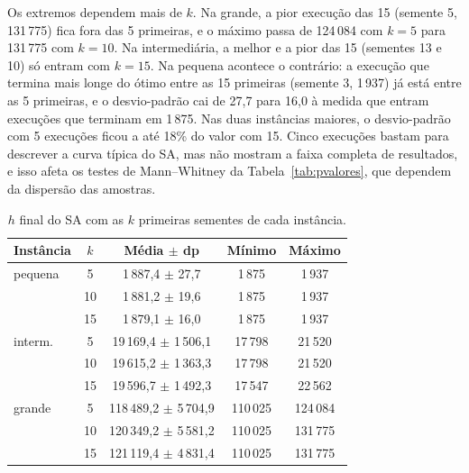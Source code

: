 Os extremos dependem mais de $k$. Na grande, a pior execução das 15 (semente 5, 131\,775) fica fora das 5 primeiras, e o máximo passa de 124\,084 com $k=5$ para 131\,775 com $k=10$. Na intermediária, a melhor e a pior das 15 (sementes 13 e 10) só entram com $k=15$. Na pequena acontece o contrário: a execução que termina mais longe do ótimo entre as 15 primeiras (semente 3, 1\,937) já está entre as 5 primeiras, e o desvio-padrão cai de 27{,}7 para 16{,}0 à medida que entram execuções que terminam em 1\,875. Nas duas instâncias maiores, o desvio-padrão com 5 execuções ficou a até 18\% do valor com 15. Cinco execuções bastam para descrever a curva típica do SA, mas não mostram a faixa completa de resultados, e isso afeta os testes de Mann--Whitney da Tabela~\ref{tab:pvalores}, que dependem da dispersão das amostras.

\begin{table}[H]
\centering
\caption{$h$ final do SA com as $k$ primeiras sementes de cada instância.}
\label{tab:runs-sa}
\small
\setlength{\tabcolsep}{4pt}
\begin{tabular}{lcccc}
\toprule
Instância & $k$ & Média $\pm$ dp & Mínimo & Máximo\\
\midrule
pequena & 5  & 1\,887{,}4 $\pm$ 27{,}7 & 1\,875 & 1\,937\\
        & 10 & 1\,881{,}2 $\pm$ 19{,}6 & 1\,875 & 1\,937\\
        & 15 & 1\,879{,}1 $\pm$ 16{,}0 & 1\,875 & 1\,937\\
\midrule
interm. & 5  & 19\,169{,}4 $\pm$ 1\,506{,}1 & 17\,798 & 21\,520\\
        & 10 & 19\,615{,}2 $\pm$ 1\,363{,}3 & 17\,798 & 21\,520\\
        & 15 & 19\,596{,}7 $\pm$ 1\,492{,}3 & 17\,547 & 22\,562\\
\midrule
grande  & 5  & 118\,489{,}2 $\pm$ 5\,704{,}9 & 110\,025 & 124\,084\\
        & 10 & 120\,349{,}2 $\pm$ 5\,581{,}2 & 110\,025 & 131\,775\\
        & 15 & 121\,119{,}4 $\pm$ 4\,831{,}4 & 110\,025 & 131\,775\\
\bottomrule
\end{tabular}
\end{table}

